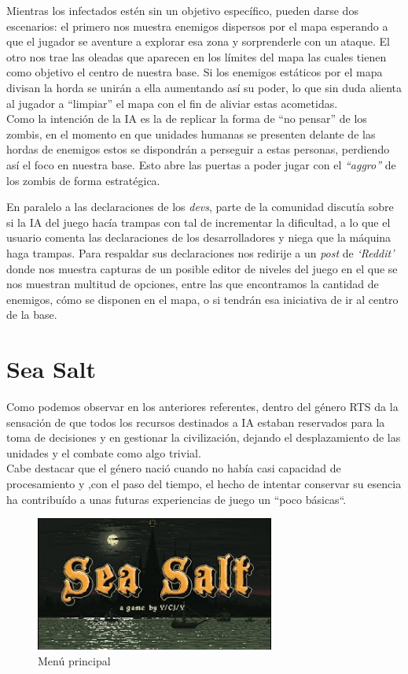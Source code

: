 Mientras los infectados estén sin un objetivo específico, pueden darse dos escenarios:
el primero nos muestra enemigos dispersos por el mapa esperando a que el jugador se aventure
a explorar esa zona y sorprenderle con un ataque. El otro nos trae las oleadas que aparecen
en los límites del mapa las cuales tienen como objetivo el centro de nuestra base. Si los
enemigos estáticos por el mapa divisan la horda se unirán a ella aumentando así su poder, lo que
sin duda alienta al jugador a ``limpiar'' el mapa con el fin de aliviar estas acometidas.\\
Como la intención de la \ac{IA} es la de replicar la forma de ``no pensar'' de los zombis, en
el momento en que unidades humanas se presenten delante de las hordas de enemigos estos se
dispondrán a perseguir a estas personas, perdiendo así el foco en nuestra base. Esto abre las
puertas a poder jugar con el \textit{``aggro''} de los zombis de forma estratégica.

En paralelo a las declaraciones de los \textit{devs}, parte de la comunidad discutía sobre si
la \ac{IA} del juego hacía trampas con tal de incrementar la dificultad, a lo que el usuario
\citeauthor*{Steam_User2019} comenta las declaraciones de los desarrolladores y niega que la
máquina haga trampas. Para respaldar sus declaraciones nos redirije a un \textit{post} de \textit{`Reddit'}
donde \citeauthor*{Pikachunet2018} nos muestra capturas de un posible editor de niveles del
juego en el que se nos muestran multitud de opciones, entre las que encontramos la cantidad de
enemigos, cómo se disponen en el mapa, o si tendrán esa iniciativa de ir al centro de la base.


\section{Sea Salt}
Como podemos observar en los anteriores referentes, dentro del género \ac{RTS} da la sensación
de que todos los recursos destinados a \ac{IA} estaban reservados para la toma de decisiones y 
en gestionar la civilización, dejando el desplazamiento de las unidades y el combate como algo
trivial. \\
Cabe destacar que el género nació cuando no había casi capacidad de procesamiento
y ,con el paso del tiempo, el hecho de intentar conservar su esencia ha contribuído a unas futuras experiencias
de juego un ``poco básicas``.

\begin{figure}[ht]
\centering
\includegraphics[width=0.7\textwidth]{imagenes/marco_teo/referentes/ss_1.png}
\caption{Menú principal}
\label{img:ss_1}
\end{figure}

